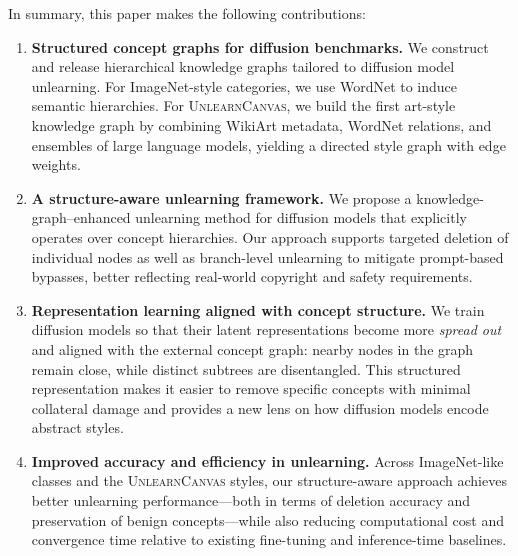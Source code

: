 In summary, this paper makes the following contributions:
\begin{enumerate}
    \item \textbf{Structured concept graphs for diffusion benchmarks.} We construct and release hierarchical knowledge graphs tailored to diffusion model unlearning. For ImageNet-style categories, we use WordNet to induce semantic hierarchies. For \textsc{UnlearnCanvas}, we build the first art-style knowledge graph by combining WikiArt metadata, WordNet relations, and ensembles of large language models, yielding a directed style graph with edge weights.
    
    \item \textbf{A structure-aware unlearning framework.} We propose a knowledge-graph–enhanced unlearning method for diffusion models that explicitly operates over concept hierarchies. Our approach supports targeted deletion of individual nodes as well as branch-level unlearning to mitigate prompt-based bypasses, better reflecting real-world copyright and safety requirements.
    
    \item \textbf{Representation learning aligned with concept structure.} We train diffusion models so that their latent representations become more \emph{spread out} and aligned with the external concept graph: nearby nodes in the graph remain close, while distinct subtrees are disentangled. This structured representation makes it easier to remove specific concepts with minimal collateral damage and provides a new lens on how diffusion models encode abstract styles.
    
    \item \textbf{Improved accuracy and efficiency in unlearning.} Across ImageNet-like classes and the \textsc{UnlearnCanvas} styles, our structure-aware approach achieves better unlearning performance—both in terms of deletion accuracy and preservation of benign concepts—while also reducing computational cost and convergence time relative to existing fine-tuning and inference-time baselines.
\end{enumerate}




